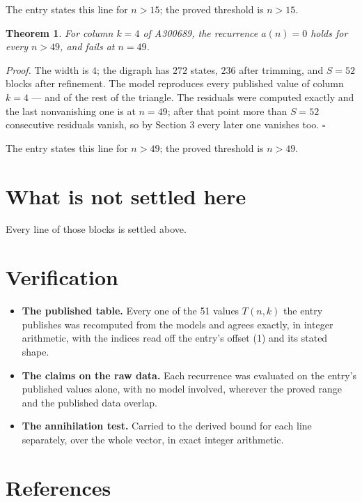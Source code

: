 \documentclass[11pt]{article}
\newtheorem{theorem}{Theorem}
\theoremstyle{definition}
\begin{document}
The entry states this line for $n > 15$; the proved threshold is $n > 15$.

\begin{theorem} For column $k = 4$ of A300689, the recurrence $a(n) = 0$ holds for every $n > 49$, and fails at $n = 49$.\end{theorem}

{\itshape Proof.} The width is $4$; the digraph has $272$ states, $236$ after trimming, and $S = 52$ blocks after refinement. The model reproduces every published value of column $k = 4$ --- and of the rest of the triangle. The residuals were computed exactly and the last nonvanishing one is at $n = 49$; after that point more than $S = 52$ consecutive residuals vanish, so by Section 3 every later one vanishes too. $\square$

The entry states this line for $n > 49$; the proved threshold is $n > 49$.

\section{What is not settled here}

Every line of those blocks is settled above.

\section{Verification}

\begin{itemize}

\item {\bfseries The published table.} Every one of the 51 values $T(n,k)$ the entry publishes was recomputed from the models and agrees exactly, in integer arithmetic, with the indices read off the entry's offset (1) and its stated shape.

\item {\bfseries The claims on the raw data.} Each recurrence was evaluated on the entry's published values alone, with no model involved, wherever the proved range and the published data overlap.

\item {\bfseries The annihilation test.} Carried to the derived bound for each line separately, over the whole vector, in exact integer arithmetic.

\end{itemize}

\section{References}
\end{document}
